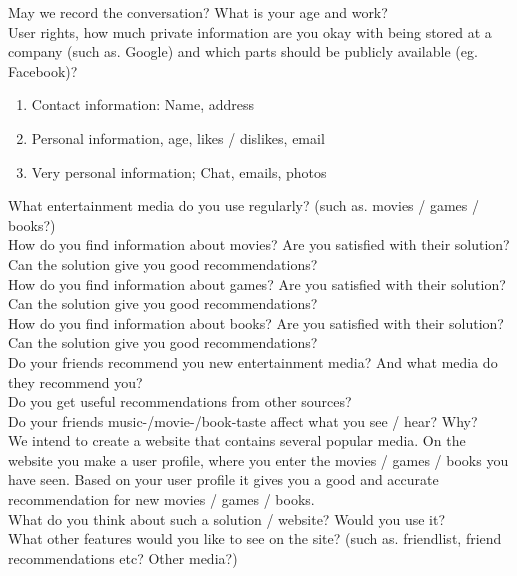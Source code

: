 May we record the conversation?
What is your age and work?\\

User rights, how much private information are you okay with being stored at a company (such as. Google) and which parts should be publicly available (eg. Facebook)?
\begin{enumerate}
\item Contact information: Name, address
\item Personal information, age, likes / dislikes, email
\item Very personal information; Chat, emails, photos
\end{enumerate}
 
What entertainment media do you use regularly? (such as. movies / games / books?)\\
 
How do you find information about movies? Are you satisfied with their solution?\\ Can the solution give you good recommendations?\\
How do you find information about games? Are you satisfied with their solution? Can the solution give you good recommendations?\\
How do you find information about books? Are you satisfied with their solution? Can the solution give you good recommendations?\\
 
Do your friends recommend you new entertainment media? And what media do they recommend you?\\
Do you get useful recommendations from other sources?\\
Do your friends music-/movie-/book-taste affect what you see / hear? Why?\\

We intend to create a website that contains several popular media. On the website you make a user profile, where you enter the movies / games / books you have seen. Based on your user profile it gives you a good and accurate recommendation for new movies / games / books.\\

What do you think about such a solution / website? Would you use it?\\

What other features would you like to see on the site? (such as. friendlist, friend recommendations etc? Other media?)\\

